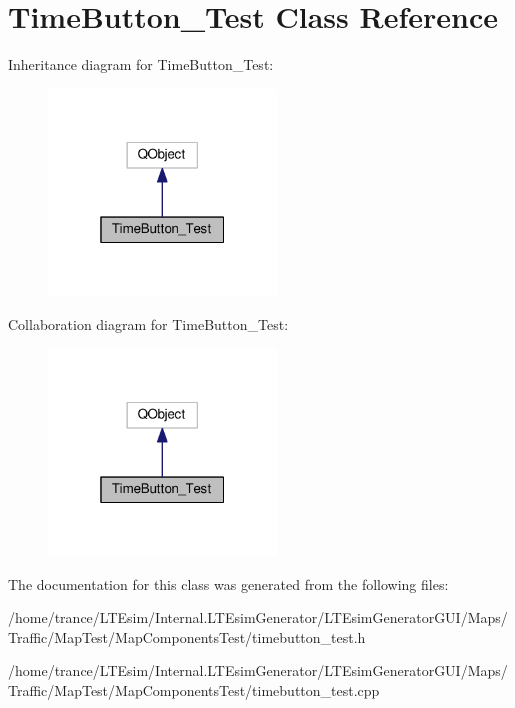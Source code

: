 \hypertarget{class_time_button___test}{}\section{Time\+Button\+\_\+\+Test Class Reference}
\label{class_time_button___test}


Inheritance diagram for Time\+Button\+\_\+\+Test\+:
\nopagebreak
\begin{figure}[H]
\begin{center}
\leavevmode
\includegraphics[width=172pt]{class_time_button___test__inherit__graph}
\end{center}
\end{figure}


Collaboration diagram for Time\+Button\+\_\+\+Test\+:
\nopagebreak
\begin{figure}[H]
\begin{center}
\leavevmode
\includegraphics[width=172pt]{class_time_button___test__coll__graph}
\end{center}
\end{figure}


The documentation for this class was generated from the following files\+:\begin{DoxyCompactItemize}
\item 
/home/trance/\+L\+T\+Esim/\+Internal.\+L\+T\+Esim\+Generator/\+L\+T\+Esim\+Generator\+G\+U\+I/\+Maps/\+Traffic/\+Map\+Test/\+Map\+Components\+Test/timebutton\+\_\+test.\+h\item 
/home/trance/\+L\+T\+Esim/\+Internal.\+L\+T\+Esim\+Generator/\+L\+T\+Esim\+Generator\+G\+U\+I/\+Maps/\+Traffic/\+Map\+Test/\+Map\+Components\+Test/timebutton\+\_\+test.\+cpp\end{DoxyCompactItemize}
